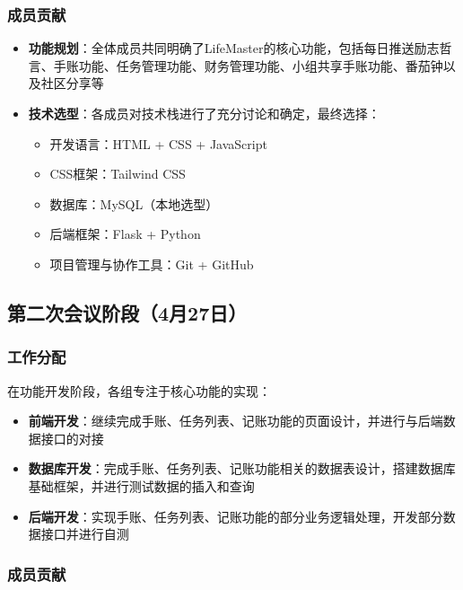 \documentclass[a4paper]{article}
\begin{document}
\subsubsection{成员贡献}

\begin{itemize}
    \item \textbf{功能规划}：全体成员共同明确了LifeMaster的核心功能，包括每日推送励志哲言、手账功能、任务管理功能、财务管理功能、小组共享手账功能、番茄钟以及社区分享等
    \item \textbf{技术选型}：各成员对技术栈进行了充分讨论和确定，最终选择：
    \begin{itemize}
        \item 开发语言：HTML + CSS + JavaScript
        \item CSS框架：Tailwind CSS
        \item 数据库：MySQL（本地选型）
        \item 后端框架：Flask + Python
        \item 项目管理与协作工具：Git + GitHub
    \end{itemize}
\end{itemize}

\subsection{第二次会议阶段（4月27日）}

\subsubsection{工作分配}

在功能开发阶段，各组专注于核心功能的实现：

\begin{itemize}
    \item \textbf{前端开发}：继续完成手账、任务列表、记账功能的页面设计，并进行与后端数据接口的对接
    \item \textbf{数据库开发}：完成手账、任务列表、记账功能相关的数据表设计，搭建数据库基础框架，并进行测试数据的插入和查询
    \item \textbf{后端开发}：实现手账、任务列表、记账功能的部分业务逻辑处理，开发部分数据接口并进行自测
\end{itemize}

\subsubsection{成员贡献}
\end{document}
